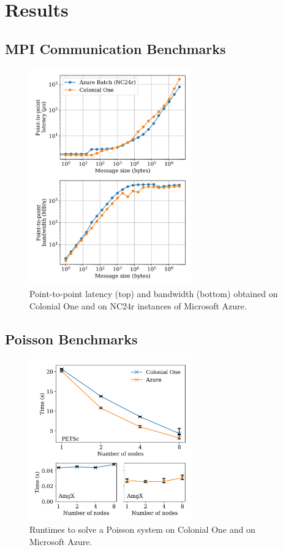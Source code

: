 \documentclass[10pt,journal,compsoc]{IEEEtran}
\begin{document}
\section{Results}\label{sec:results}

\subsection{MPI Communication Benchmarks}\label{subsec:mpi_benchmarks}

\begin{figure}[!ht]
    \centering
    \includegraphics[width=7cm]{figures/osu_latency_bandwidth.png}
    \caption{Point-to-point latency (top) and bandwidth (bottom) obtained on Colonial One and on NC24r instances of Microsoft Azure.}
    \label{fig:osu_benchmarks}
\end{figure}

\subsection{Poisson Benchmarks}\label{subsec:poisson_benchmarks}

\begin{figure}[!ht]
    \centering
    \includegraphics[width=7cm]{figures/poisson_time_vs_nodes.png}
    \caption{Runtimes to solve a Poisson system on Colonial One and on Microsoft Azure.}
    \label{fig:poisson_benchmarks}
\end{figure}
\end{document}
